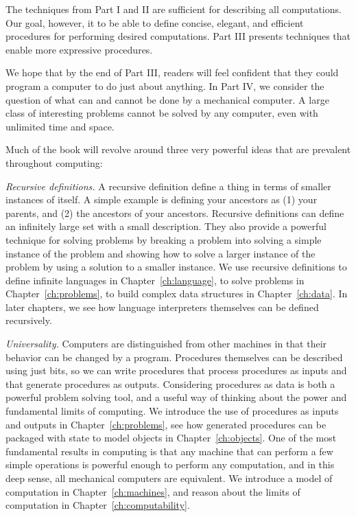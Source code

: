  The techniques from Part I and II are sufficient for describing all computations.  Our goal, however, it to be able to define concise, elegant, and efficient procedures for performing desired computations.  Part III presents techniques that enable more expressive procedures.

 We hope that by the end of Part III, readers will feel confident that they could program a computer to do just about anything.  In Part IV, we consider the question of what can and cannot be done by a mechanical computer.  A large class of interesting problems cannot be solved by any computer, even with unlimited time and space. 

 Much of the book will revolve around three very powerful ideas that are prevalent throughout computing:

\emph{Recursive definitions.} A recursive definition define a thing in terms of smaller instances of itself.  A simple example is defining your ancestors as (1) your parents, and (2) the ancestors of your ancestors.  Recursive definitions can define an infinitely large set with a small description.  They also provide a powerful technique for solving problems by breaking a problem into solving a simple instance of the problem and showing how to solve a larger instance of the problem by using a solution to a smaller instance.  We use recursive definitions to define infinite languages in Chapter~\ref{ch:language}, to solve problems in Chapter~\ref{ch:problems}, to build complex data structures in Chapter~\ref{ch:data}.  In later chapters, we see how language interpreters themselves can be defined recursively.

\emph{Universality.} Computers are distinguished from other machines in that their behavior can be changed by a program.  Procedures themselves can be described using just bits, so we can write procedures that process procedures as inputs and that generate procedures as outputs.  Considering procedures as data is both a powerful problem solving tool, and a useful way of thinking about the power and fundamental limits of computing.  We introduce the use of procedures as inputs and outputs in Chapter~\ref{ch:problems}, see how generated procedures can be packaged with state to model objects in Chapter~\ref{ch:objects}.  One of the most fundamental results in computing is that any machine that can perform a few simple operations is powerful enough to perform any computation, and in this deep sense, all mechanical computers are equivalent.  We introduce a model of computation in Chapter~\ref{ch:machines}, and reason about the limits of computation in Chapter~\ref{ch:computability}.

